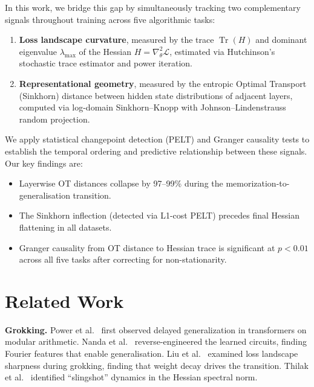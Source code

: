 \documentclass[12pt,twoside]{article}
\newcommand{\Tr}{\operatorname{Tr}}
\begin{document}
In this work, we bridge this gap by simultaneously tracking two complementary
signals throughout training across five algorithmic tasks:

\begin{enumerate}
  \item \textbf{Loss landscape curvature}, measured by the trace
    \(\Tr(H)\) and dominant eigenvalue \(\lambda_{\max}\) of the Hessian
    \(H = \nabla^2_\theta \mathcal{L}\), estimated via Hutchinson's stochastic
    trace estimator and power iteration.
  \item \textbf{Representational geometry}, measured by the entropic Optimal
    Transport (Sinkhorn) distance between hidden state distributions of
    adjacent layers, computed via log-domain Sinkhorn--Knopp with
    Johnson--Lindenstrauss random projection.
\end{enumerate}

We apply statistical changepoint detection (PELT) and Granger causality tests
to establish the temporal ordering and predictive relationship between these
signals. Our key findings are:

\begin{itemize}
  \item Layerwise OT distances collapse by 97--99\% during the
    memorization-to-generalisation transition.
  \item The Sinkhorn inflection (detected via L1-cost PELT) precedes final
    Hessian flattening in all datasets.
  \item Granger causality from OT distance to Hessian trace is significant at
    \(p<0.01\) across all five tasks after correcting for non-stationarity.
\end{itemize}

\section{Related Work}
\label{sec:related}

\textbf{Grokking.}
Power et al.\ \citep{power2022grokking} first observed delayed generalization
in transformers on modular arithmetic. Nanda et al.\ \citep{nanda2022progress}
reverse-engineered the learned circuits, finding Fourier features that enable
generalisation. Liu et al.\ \citep{liu2022loss} examined loss landscape
sharpness during grokking, finding that weight decay drives the transition.
Thilak et al.\ \citep{thilak2022slingshot} identified ``slingshot'' dynamics
in the Hessian spectral norm.
\end{document}
